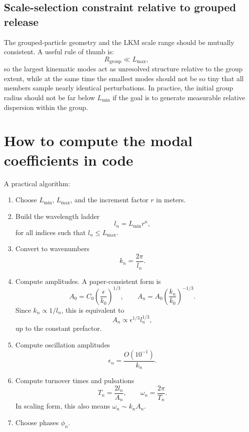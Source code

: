 \documentclass[11pt,a4paper]{article}
\begin{document}
	\subsection{Scale-selection constraint relative to grouped release}
	
	The grouped-particle geometry and the LKM scale range should be mutually consistent. A useful rule of thumb is:
	\begin{equation}
		R_{\mathrm{group}} \ll L_{\max},
	\end{equation}
	so the largest kinematic modes act as unresolved structure relative to the group extent, while at the same time the smallest modes should not be so tiny that all members sample nearly identical perturbations. In practice, the initial group radius should not be far below $L_{\min}$ if the goal is to generate measurable relative dispersion within the group.
	
	\section{How to compute the modal coefficients in code}
	
	A practical algorithm:
	\begin{enumerate}[label=\arabic*.]
		\item Choose $L_{\min}$, $L_{\max}$, and the increment factor $r$ in meters.
		\item Build the wavelength ladder
		\begin{equation*}
			l_n = L_{\min} r^n,
		\end{equation*}
		for all indices such that $l_n \le L_{\max}$.
		\item Convert to wavenumbers
		\begin{equation*}
			k_n = \frac{2\pi}{l_n}.
		\end{equation*}
		\item Compute amplitudes. A paper-consistent form is
		\begin{equation*}
			A_0 = C_0 \left(\frac{\epsilon}{k_0}\right)^{1/3}, \qquad
			A_n = A_0 \left(\frac{k_n}{k_0}\right)^{-1/3}.
		\end{equation*}
		Since $k_n \propto 1/l_n$, this is equivalent to
		\begin{equation*}
			A_n \propto \epsilon^{1/3} l_n^{1/3},
		\end{equation*}
		up to the constant prefactor.
		\item Compute oscillation amplitudes
		\begin{equation*}
			\epsilon_n = \frac{O(10^{-1})}{k_n}.
		\end{equation*}
		\item Compute turnover times and pulsations
		\begin{equation*}
			T_n = \frac{2 l_n}{A_n}, \qquad \omega_n = \frac{2\pi}{T_n}.
		\end{equation*}
		In scaling form, this also means $\omega_n \sim k_n A_n$.
		\item Choose phases $\phi_n$.
	\end{enumerate}
	
\end{document}
